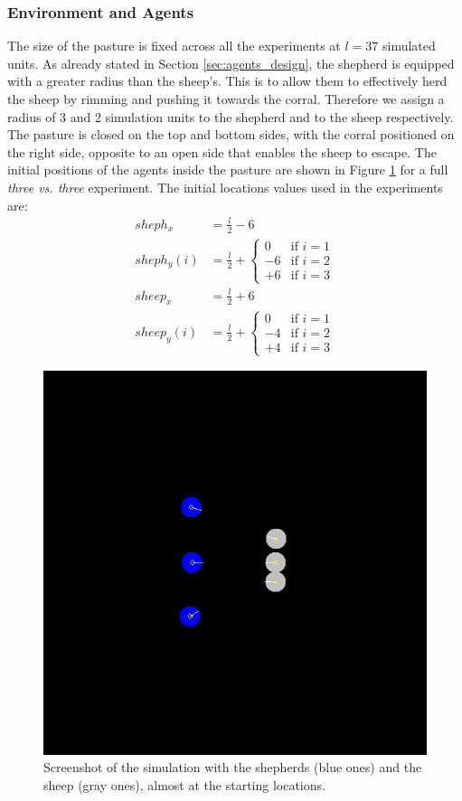 \documentclass[conference]{IEEEtran}
\begin{document}
\vspace{0.5em}
\subsubsection{Environment and Agents}
The size of the pasture is fixed across all the experiments at $l = 37$ simulated units.
As already stated in Section \ref{sec:agents_design}, the shepherd is equipped with a greater radius than the sheep's.
This is to allow them to effectively herd the sheep by rimming and pushing it towards the corral.
Therefore we assign a radius of $3$ and $2$ simulation units to the shepherd and to the sheep respectively.
The pasture is closed on the top and bottom sides, with the corral positioned on the right side, opposite to an open side that enables the sheep to escape.
The initial positions of the agents inside the pasture are shown in Figure \ref{fig:simulation_screenshot} for a full \textit{three vs. three} experiment.
The initial locations values used in the experiments are:
\begin{align}
sheph_x &= \frac{l}{2} - 6 \\
sheph_y(i) &= \frac{l}{2} + \begin{cases} 0 & \text{if } i=1 \\ -6 & \text{if } i=2 \\ +6 & \text{if } i=3 \end{cases} \\
sheep_x &= \frac{l}{2} + 6 \\
sheep_y(i) &= \frac{l}{2} + \begin{cases} 0 & \text{if } i=1 \\ -4 & \text{if } i=2 \\ +4 & \text{if } i=3 \end{cases}
\end{align}

\begin{figure}[t]
	\centering
	\includegraphics[width=0.8\hsize]{imgs/pasture.png}
	\caption{Screenshot of the simulation with the shepherds (blue ones) and the sheep (gray ones), almost at the starting locations.}
	\label{fig:simulation_screenshot}
\end{figure}
\end{document}
